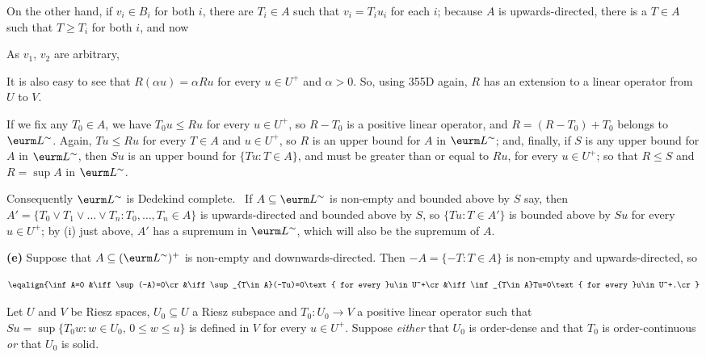 {\noindent On the other hand, if $v_i\in B_i$ for both $i$, there are
$T_i\in A$ such that $v_i=T_iu_i$ for each $i$;  because $A$ is
upwards-directed, there is a $T\in A$ such that $T\ge T_i$ for both $i$,
and now


\noindent As $v_1$, $v_2$ are arbitrary,


\noindent It is also easy to see that $R(\alpha u)=\alpha Ru$ for every
$u\in U^+$ and $\alpha>0$.   So, using 355D again, $R$ has an extension
to a linear operator from $U$ to $V$.

If we fix any $T_0\in A$, we have $T_0u\le Ru$ for every $u\in U^+$,
so $R-T_0$ is a positive linear operator, and $R=(R-T_0)+T_0$ belongs to
$\eurm L^{\sim}$.   Again, $Tu\le Ru$ for every $T\in A$ and $u\in U^+$, so
$R$ is an upper bound for $A$ in $\eurm L^{\sim}$;  and, finally, if $S$
is any upper bound for $A$ in $\eurm L^{\sim}$, then
$Su$ is an upper bound for $\{Tu:T\in A\}$, and must be greater than or
equal to $Ru$, for every $u\in U^+$;  so that $R\le S$ and $R=\sup A$ in
$\eurm L^{\sim}$.

\medskip

 Consequently
$\eurm L^{\sim}$ is Dedekind complete.   \Prf\ If
$A\subseteq\eurm L^{\sim}$ is
non-empty and bounded above by $S$ say, then $A'=\{T_0\vee
T_1\vee\ldots\vee T_n:T_0,\ldots,T_n\in A\}$ is upwards-directed and
bounded above by $S$, so $\{Tu:T\in A'\}$ is bounded above by $Su$ for
every $u\in U^+$;  by (i) just above, $A'$ has a supremum in $\eurm
L^{\sim}$, which will also be the supremum of $A$.\ \Qed

\medskip

{\bf (e)} Suppose that $A\subseteq(\eurm L^{\sim})^+$ is non-empty and
downwards-directed.   Then $-A=\{-T:T\in A\}$ is non-empty and
upwards-directed, so

$$\eqalign{\inf A=0
&\iff\sup(-A)=0\cr
&\iff\sup_{T\in A}(-Tu)=0\text{ for every }u\in U^+\cr
&\iff\inf_{T\in A}Tu=0\text{ for every }u\in U^+.\cr}$$
}%

 Let $U$ and $V$ be Riesz spaces,
$U_0\subseteq U$ a Riesz subspace and $T_0:U_0\to V$ a
positive linear operator such that
$Su=\sup\{T_0w:w\in U_0,\,0\le w\le u\}$ is defined in $V$ for every
$u\in U^+$.   Suppose {\it either} that
$U_0$ is order-dense and that $T_0$ is order-continuous {\it or}
that $U_0$ is solid.

